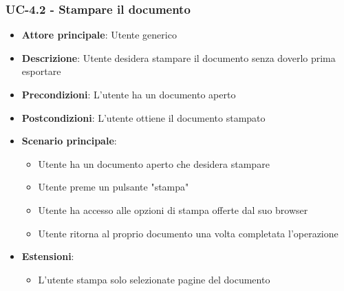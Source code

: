 \documentclass[11pt,a4paper]{article}
\begin{document}
\subsubsection{UC-4.2 - Stampare il documento}
\begin{itemize}
    \item \textbf{Attore principale}: Utente generico
    \item \textbf{Descrizione}: Utente desidera stampare il documento senza doverlo prima esportare
    \item \textbf{Precondizioni}: L'utente ha un documento aperto
    \item \textbf{Postcondizioni}: L'utente ottiene il documento stampato
    \item \textbf{Scenario principale}:
        \begin{itemize}
            \item Utente ha un documento aperto che desidera stampare
            \item Utente preme un pulsante "stampa"
            \item Utente ha accesso alle opzioni di stampa offerte dal suo browser
            \item Utente ritorna al proprio documento una volta completata l'operazione
        \end{itemize}
    \item \textbf{Estensioni}:
        \begin{itemize}
            \item L'utente stampa solo selezionate pagine del documento
        \end{itemize}
\end{itemize}
\end{document}
